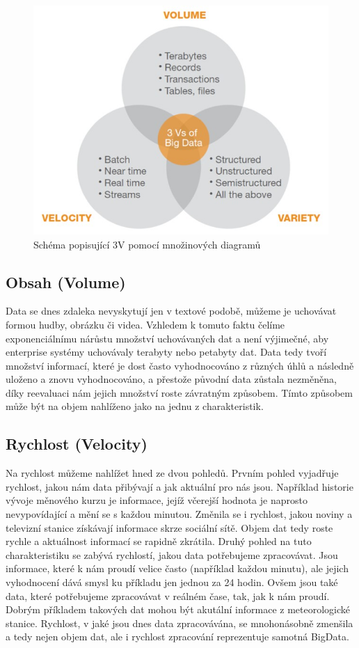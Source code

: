 \begin{figure}[h]
\centering
\includegraphics[scale=0.6]{images/3v}
\caption{Schéma popisující 3V pomocí množinových diagramů \cite{3vimg}}
\label{fig:3v}

\end{figure}

\subsection[3v-volume]{Obsah (Volume)}
Data se dnes zdaleka nevyskytují jen v textové podobě, můžeme je uchovávat formou hudby, obrázku či videa. Vzhledem k tomuto faktu čelíme exponenciálnímu nárůstu množství uchovávaných dat a není výjimečné, aby enterprise systémy uchovávaly terabyty nebo petabyty dat. Data tedy tvoří množství informací, které je dost často vyhodnocováno z různých úhlů a následně uloženo a znovu vyhodnocováno, a přestože původní data zůstala nezměněna, díky reevaluaci nám jejich množství roste závratným způsobem. Tímto způsobem může být na objem nahlíženo jako na jednu z charakteristik. %

\subsection{Rychlost (Velocity)}
Na rychlost můžeme nahlížet hned ze dvou pohledů. Prvním pohled vyjadřuje rychlost, jakou nám data přibývají a jak aktuální pro nás jsou. Například historie vývoje měnového kurzu je informace, jejíž včerejší hodnota je naprosto nevypovídající a mění se s každou minutou. Změnila se i rychlost, jakou noviny a televizní stanice získávají informace skrze sociální sítě. Objem dat tedy roste rychle a aktuálnost informací se rapidně zkrátila. Druhý pohled na tuto charakteristiku se zabývá rychlostí, jakou data potřebujeme zpracovávat. Jsou informace, které k nám proudí velice často (například každou minutu), ale jejich vyhodnocení dává smysl ku příkladu jen jednou za 24 hodin. Ovšem jsou také data, které potřebujeme zpracovávat v reálném čase, tak, jak k nám proudí. Dobrým příkladem takových dat mohou být akutální informace z meteorologické stanice. 
Rychlost, v jaké jsou dnes data zpracovávána, se mnohonásobně zmenšila a tedy nejen objem dat, ale i rychlost zpracování reprezentuje samotná BigData.

